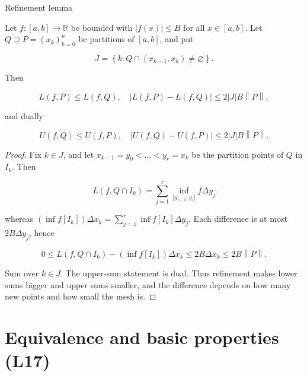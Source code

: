 \begin{theorem}{Refinement lemma}

Let \(f:\left\lbrack {a,b} \right\rbrack\rightarrow\mathbb{R}\) be bounded with \(\left| {f(x)} \right| \leq B\) for all \(x \in \left\lbrack {a,b} \right\rbrack\). Let \(Q \supseteq P = \left( x_{k} \right)_{k = 0}^{n}\) be partitions of \(\left\lbrack {a,b} \right\rbrack\), and put

\[J = \left\{ {k:Q \cap \left( {x_{k - 1},x_{k}} \right) \neq \varnothing} \right\}.\]

Then

\[L\left( {f,P} \right) \leq L\left( {f,Q} \right),\quad\left| {L\left( {f,P} \right) - L\left( {f,Q} \right)} \right| \leq 2|J|B\left\| P \right\|,\]

and dually

\[U\left( {f,Q} \right) \leq U\left( {f,P} \right),\quad\left| {U\left( {f,Q} \right) - U\left( {f,P} \right)} \right| \leq 2|J|B\left\| P \right\|.\]

\end{theorem}

\begin{proof}

Fix \(k \in J\), and let \(x_{k - 1} = y_{0} < \ldots < y_{r} = x_{k}\) be the partition points of \(Q\) in \(I_{k}\). Then

\[L\left( {f,Q \cap I_{k}} \right) = \sum\limits_{j = 1}^{r}\inf\limits_{\lbrack{y_{j - 1},y_{j}}\rbrack}f\Delta y_{j}\]

whereas \(\left( {\inf f\left\lbrack I_{k} \right\rbrack} \right)\Delta x_{k} = \sum_{j = 1}^{r}\inf f\left\lbrack I_{k} \right\rbrack\Delta y_{j}\). Each difference is at most \(2B\Delta y_{j}\), hence

\[0 \leq L\left( {f,Q \cap I_{k}} \right) - \left( {\inf f\left\lbrack I_{k} \right\rbrack} \right)\Delta x_{k} \leq 2B\Delta x_{k} \leq 2B\left\| P \right\|.\]

Sum over \(k \in J\). The upper-sum statement is dual. Thus refinement makes lower sums bigger and upper sums smaller, and the difference depends on how many new points and how small the mesh is.

\end{proof}

\section{Equivalence and basic properties (L17)}


